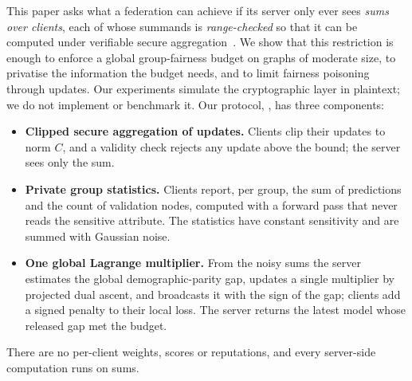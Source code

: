 This paper asks what a federation can achieve if its server only ever sees \emph{sums over clients}, each of whose summands is \emph{range-checked} so that it can be computed under verifiable secure aggregation~\citep{corrigangibbs2017prio,lycklama2023rofl}. We show that this restriction is enough to enforce a global group-fairness budget on graphs of moderate size, to privatise the information the budget needs, and to limit fairness poisoning through updates. Our experiments simulate the cryptographic layer in plaintext; we do not implement or benchmark it. Our protocol, \clamp{}, has three components:
\begin{itemize}
\item \textbf{Clipped secure aggregation of updates.} Clients clip their updates to norm $C$, and a validity check rejects any update above the bound; the server sees only the sum.
\item \textbf{Private group statistics.} Clients report, per group, the sum of predictions and the count of validation nodes, computed with a forward pass that never reads the sensitive attribute. The statistics have constant sensitivity and are summed with Gaussian noise.
\item \textbf{One global Lagrange multiplier.} From the noisy sums the server estimates the global demographic-parity gap, updates a single multiplier by projected dual ascent, and broadcasts it with the sign of the gap; clients add a signed penalty to their local loss. The server returns the latest model whose released gap met the budget.
\end{itemize}
There are no per-client weights, scores or reputations, and every server-side computation runs on sums.

